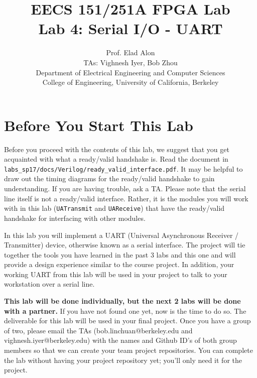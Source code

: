 \documentclass[11pt]{article}
\begin{document}
\title{EECS 151/251A FPGA Lab\\
Lab 4: Serial I/O - UART}

\author{Prof. Elad Alon \\
TAs: Vighnesh Iyer, Bob Zhou \\Department of Electrical Engineering and Computer Sciences\\
College of Engineering, University of California, Berkeley}
\date{}
\maketitle

\tableofcontents

\section{Before You Start This Lab}

Before you proceed with the contents of this lab, we suggest that you get acquainted with what a ready/valid handshake is. Read the document in \verb|labs_sp17/docs/Verilog/ready_valid_interface.pdf|. It may be helpful to draw out the timing diagrams for the ready/valid handshake to gain understanding. If you are having trouble, ask a TA. Please note that the serial line itself is not a ready/valid interface. Rather, it is the modules you will work with in this lab (\verb|UATransmit| and \verb|UAReceive|) that have the ready/valid handshake for interfacing with other modules.

In this lab you will implement a UART (Universal Asynchronous Receiver / Transmitter) device, otherwise known as a serial interface. The project will tie together the tools you have learned in the past 3 labs and this one and will provide a design experience similar to the course project. In addition, your working UART from this lab will be used in your project to talk to your workstation over a serial line.

\textbf{This lab will be done individually, but the next 2 labs will be done with a partner.} If you have not found one yet, now is the time to do so. The deliverable for this lab will be used in your final project. Once you have a group of two, please email the TAs (bob.linchuan@berkeley.edu and vighnesh.iyer@berkeley.edu) with the names and Github ID's of both group members so that we can create your team project repositories. You can complete the lab without having your project repository yet; you'll only need it for the project.
\end{document}

